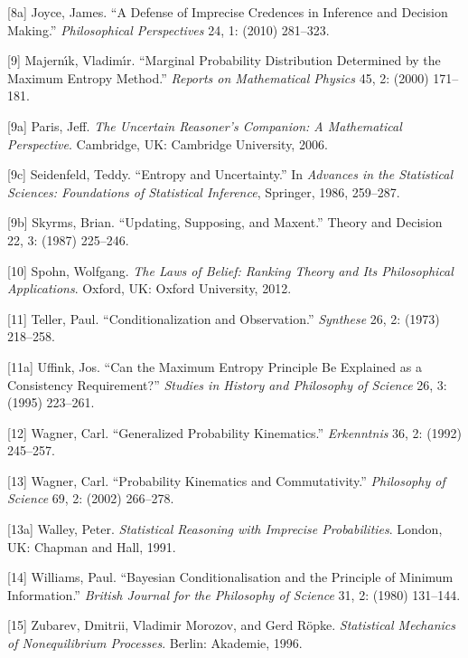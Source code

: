 \documentclass[entropy,article,submit,oneauthor,pdftex,12pt,a4paper]{mdpi}
\begin{document}
[8a] Joyce, James. ``A Defense of Imprecise Credences in Inference and Decision Making.'' \emph{Philosophical Perspectives} 24, 1: (2010) 281--323.

[9] Majern{\'\i}k, Vladim{\'\i}r. ``Marginal Probability Distribution Determined by the Maximum Entropy Method.'' \emph{Reports on Mathematical Physics} 45, 2: (2000) 171--181.

[9a] Paris, Jeff. \emph{The Uncertain Reasoner's Companion: A Mathematical Perspective}. Cambridge, UK: Cambridge University, 2006.

[9c] Seidenfeld, Teddy. ``Entropy and Uncertainty.'' In \emph{Advances in the Statistical Sciences: Foundations of Statistical Inference}, Springer, 1986, 259--287.

[9b] Skyrms, Brian. ``Updating, Supposing, and Maxent.'' Theory and Decision 22, 3: (1987) 225--246.

[10] Spohn, Wolfgang. \emph{The Laws of Belief: Ranking Theory and Its Philosophical Applications}. Oxford, UK: Oxford University, 2012.

[11] Teller, Paul. ``Conditionalization and Observation.'' \emph{Synthese} 26, 2: (1973) 218--258.

[11a] Uffink, Jos. ``Can the Maximum Entropy Principle Be Explained as a Consistency Requirement?'' \emph{Studies in History and Philosophy of Science} 26, 3: (1995) 223--261.

[12] Wagner, Carl. ``Generalized Probability Kinematics.'' \emph{Erkenntnis} 36, 2: (1992) 245--257.

[13] Wagner, Carl. ``Probability Kinematics and Commutativity.'' \emph{Philosophy of Science} 69, 2: (2002) 266--278.

[13a] Walley, Peter. \emph{Statistical Reasoning with Imprecise Probabilities}. London, UK: Chapman and Hall, 1991.

[14] Williams, Paul. ``Bayesian Conditionalisation and the Principle of Minimum Information.'' \emph{British Journal for the Philosophy of Science} 31, 2: (1980) 131--144.

[15] Zubarev, Dmitrii, Vladimir Morozov, and Gerd R{\"o}pke. \emph{Statistical Mechanics of Nonequilibrium Processes}. Berlin: Akademie, 1996.




\end{document}
